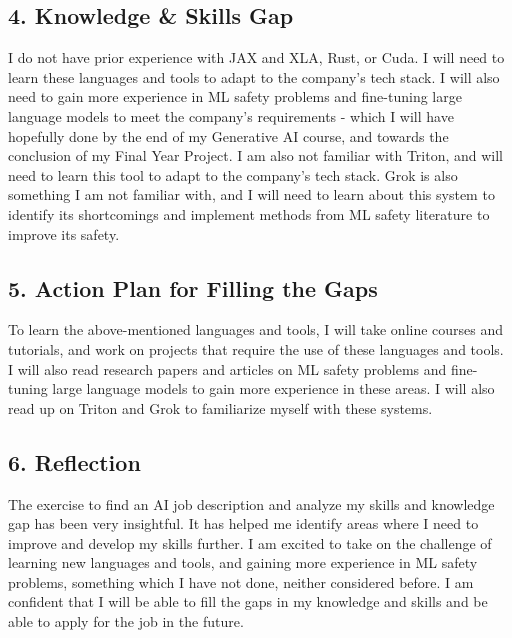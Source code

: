 \documentclass{article}
\theoremstyle{mytheoremstyle}
\theoremstyle{mytheoremstyle}
\theoremstyle{myproblemstyle}
\begin{document}
\subsection*{4. Knowledge \& Skills Gap}

I do not have prior experience with JAX and XLA, Rust, or Cuda. I will need to learn these languages and tools to adapt to the company's tech stack. I will also need to gain more experience in ML safety problems and fine-tuning large language models to meet the company's requirements - which I will have hopefully done by the end of my Generative AI course, and towards the conclusion of my Final Year Project. I am also not familiar with Triton, and will need to learn this tool to adapt to the company's tech stack. Grok is also something I am not familiar with, and I will need to learn about this system to identify its shortcomings and implement methods from ML safety literature to improve its safety. 

\subsection*{5. Action Plan for Filling the Gaps}

To learn the above-mentioned languages and tools, I will take online courses and tutorials, and work on projects that require the use of these languages and tools. I will also read research papers and articles on ML safety problems and fine-tuning large language models to gain more experience in these areas. I will also read up on Triton and Grok to familiarize myself with these systems.


\subsection*{6. Reflection}

The exercise to find an AI job description and analyze my skills and knowledge gap has been very insightful. It has helped me identify areas where I need to improve and develop my skills further. I am excited to take on the challenge of learning new languages and tools, and gaining more experience in ML safety problems, something which I have not done, neither considered before. I am confident that I will be able to fill the gaps in my knowledge and skills and be able to apply for the job in the future.
\end{document}
